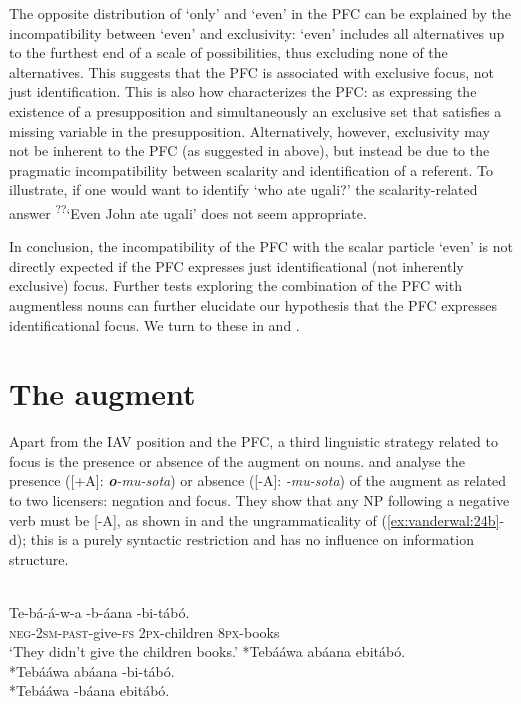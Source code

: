\documentclass[output=paper]{langsci/langscibook}
\begin{document}
The opposite distribution of ‘only’ and ‘even’ in the PFC can be explained by the incompatibility between ‘even’ and exclusivity: ‘even’ includes all alternatives up to the furthest end of a scale of possibilities, thus excluding none of the alternatives. This suggests that the PFC is associated with exclusive focus, not just identification. This is also how \citet[52]{Walusimbi1996} characterizes the PFC: as expressing the existence of a presupposition and simultaneously an exclusive set that satisfies a missing variable in the presupposition. Alternatively, however, exclusivity may not be inherent to the PFC (as suggested in  above), but instead be due to the pragmatic incompatibility between scalarity and identification of a referent. To illustrate, if one would want to identify ‘who ate ugali?’ the scalarity-related answer \textsuperscript{??}‘Even John ate ugali’ does not seem appropriate.

  In conclusion, the incompatibility of the PFC with the scalar particle ‘even’ is not directly expected if the PFC expresses just identificational (not inherently exclusive) focus. Further tests exploring the combination of the PFC with augmentless nouns can further elucidate our hypothesis that the PFC expresses identificational focus. We turn to these in  and .

\section{The augment}\label{sec:vanderwal:4}

Apart from the IAV position and the PFC, a third linguistic strategy related to focus is the presence or absence of the augment on nouns.  \citet{HymanKatamba1990} and \citet{HymanKatamba1993} analyse the presence ([+A]: \textbf{\textit{o}}\textit{-mu-sota}) or absence ([-A]: \textit{{\longrule}-mu-sota}) of the augment as related to two licensers: negation and focus. They show that any NP following a negative verb must be [-A], as shown in  and the ungrammaticality of (\ref{ex:vanderwal:24b}-d); this is a purely syntactic restriction and has no influence on information structure.

\ea\label{ex:vanderwal:24} \citet[224]{HymanKatamba1993} \\
\ea\label{ex:vanderwal:24a}
\gll    Te-bá-á-w-a      {\longrule}-b-áana    {\longrule}-bi-tábó.\\
       \textsc{neg}-\textsc{2sm}-\textsc{past}-give-\textsc{fs}       \textsc{2px}-children       \textsc{8px}-books\\
\glt   ‘They didn't give the children books.’
\ex \label{ex:vanderwal:24b}   *Tebááwa abáana ebitábó.\\
\ex \label{ex:vanderwal:24c}   *Tebááwa abáana {\longrule}-bi-tábó.\\
\ex \label{ex:vanderwal:24d}   *Tebááwa {\longrule}-báana ebitábó. \\
\z
\z
\end{document}
